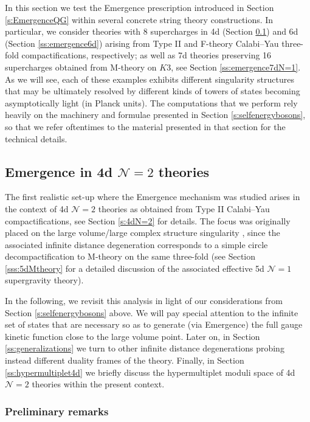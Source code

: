 In this section we test the Emergence prescription introduced in Section \ref{s:EmergenceQG} within several concrete string theory constructions. In particular, we consider theories with 8 supercharges in 4d (Section \ref{ss:emergence4d}) and 6d (Section \ref{ss:emergence6d}) arising from Type II and F-theory Calabi--Yau three-fold compactifications, respectively; as well as 7d theories preserving 16 supercharges obtained from M-theory on $K3$, see Section \ref{ss:emergence7dN=1}. As we will see, each of these examples exhibits different singularity structures that may be ultimately resolved by different kinds of towers of states becoming asymptotically light (in Planck units). The computations that we perform rely heavily on the machinery and formulae presented in Section \ref{s:selfenergybosons}, so that we refer oftentimes to the material presented in that section for the technical details. 

\subsection{Emergence in 4d $\mathcal{N}=2$ theories}
\label{ss:emergence4d}

The first realistic set-up where the Emergence mechanism was studied arises in the context of 4d $\mathcal{N}= 2$ theories as obtained from Type II Calabi--Yau compactifications, see Section \ref{s:4dN=2} for details. The focus was originally placed on the large volume/large complex structure singularity \cite{Corvilain:2018lgw,Grimm:2018ohb,Gendler:2020dfp}, since the associated infinite distance degeneration corresponds to a simple circle decompactification to M-theory on the same three-fold (see Section \ref{sss:5dMtheory} for a detailed discussion of the associated effective 5d $\mathcal{N}=1$ supergravity theory).

In the following, we revisit this analysis in light of our considerations from Section \ref{s:selfenergybosons} above. We will pay special attention to the infinite set of states that are necessary so as to generate (via Emergence) the full gauge kinetic function close to the large volume point. Later on, in Section \ref{ss:generalizations} we turn to other infinite distance degenerations probing instead different duality frames of the theory. Finally, in Section \ref{ss:hypermultiplet4d} we briefly discuss the hypermultiplet moduli space of 4d $\mathcal{N}=2$ theories within the present context.

\subsubsection{Preliminary remarks} 

